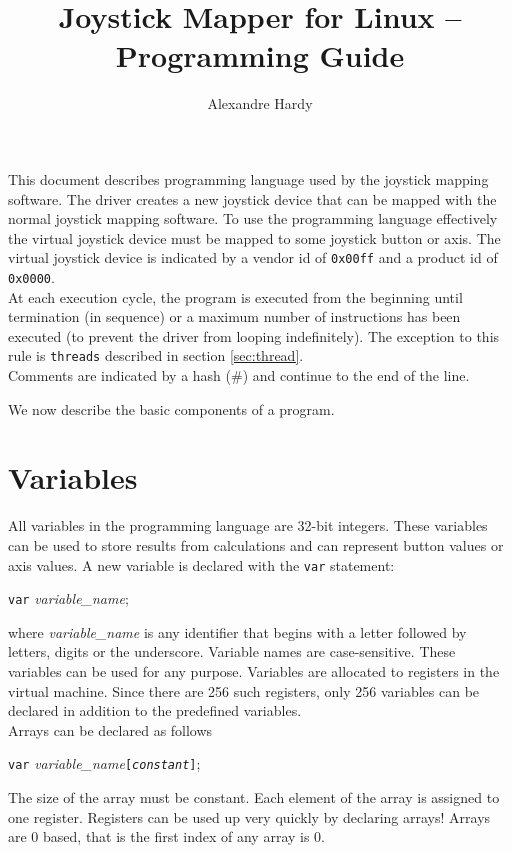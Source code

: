 \documentclass{article}
\title{Joystick Mapper for Linux -- Programming Guide}
\author{Alexandre Hardy}
\begin{document}
\maketitle
This document describes programming language used by the
joystick mapping software. The driver creates a new joystick
device that can be mapped with the normal joystick mapping
software. To use the programming language effectively
the virtual joystick device must be mapped to some joystick
button or axis. The virtual joystick device is indicated
by a vendor id of {\tt 0x00ff} and a product id of {\tt 0x0000}.\\

At each execution cycle, the program is executed from the
beginning until termination (in sequence) or a maximum number of instructions
has been executed (to prevent the driver from looping indefinitely).
The exception to this rule is {\tt threads} described in
section \ref{sec:thread}.\\

Comments are indicated by a hash (\#) and continue to the end of the line.

We now describe the basic components of a program.

\section{Variables}
All variables in the programming language are 32-bit integers.
These variables can be used to store results from calculations
and can represent button values or axis values. A new variable 
is declared with the {\tt var} statement:
\begin{center}
	{\tt var} {\it variable\_name};
\end{center}
where {\it variable\_name} is any identifier that begins with a letter
followed by letters, digits or the underscore. Variable names
are case-sensitive. These variables can be used for any purpose.
Variables are allocated to registers in the virtual machine. Since
there are 256 such registers, only 256 variables can be declared
in addition to the predefined variables.\\

Arrays can be declared as follows
\begin{center}
	{\tt var} {\it variable\_name}{\tt [{\it constant}]};
\end{center}
The size of the array must be constant. Each element of the array
is assigned to one register. Registers can be used up very 
quickly by declaring arrays! Arrays are 0 based, that is the
first index of any array is 0.\\
\end{document}
